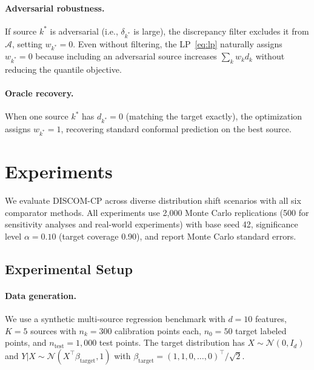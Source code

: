 \documentclass{article}
\newcommand{\DISCOM}{\textsc{DISCOM-CP}}
\begin{document}
\paragraph{Adversarial robustness.}
If source $k^*$ is adversarial (i.e., $\delta_{k^*}$ is large), the discrepancy filter excludes it from $\mathcal{A}$, setting $w_{k^*} = 0$. Even without filtering, the LP~\eqref{eq:lp} naturally assigns $w_{k^*} = 0$ because including an adversarial source increases $\sum_k w_k d_k$ without reducing the quantile objective.

\paragraph{Oracle recovery.}
When one source $k^*$ has $d_{k^*} = 0$ (matching the target exactly), the optimization assigns $w_{k^*} = 1$, recovering standard conformal prediction on the best source.

\section{Experiments}
\label{sec:experiments}

We evaluate \DISCOM{} across diverse distribution shift scenarios with all six comparator methods. All experiments use 2,000 Monte Carlo replications (500 for sensitivity analyses and real-world experiments) with base seed 42, significance level $\alpha = 0.10$ (target coverage 0.90), and report Monte Carlo standard errors.

\subsection{Experimental Setup}
\label{sec:exp_setup}

\paragraph{Data generation.}
We use a synthetic multi-source regression benchmark with $d = 10$ features, $K = 5$ sources with $n_k = 300$ calibration points each, $n_0 = 50$ target labeled points, and $n_{\text{test}} = 1{,}000$ test points. The target distribution has $X \sim \mathcal{N}(0, I_d)$ and $Y | X \sim \mathcal{N}(X^\top \beta_{\text{target}}, 1)$ with $\beta_{\text{target}} = (1, 1, 0, \ldots, 0)^\top / \sqrt{2}$.
\end{document}
